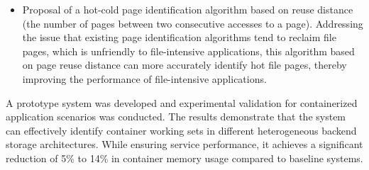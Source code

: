 \begin{englishabstract}
\begin{itemize}
    \item Proposal of a hot-cold page identification algorithm based on reuse distance (the number of pages between two consecutive accesses to a page). Addressing the issue that existing page identification algorithms tend to reclaim file pages, which is unfriendly to file-intensive applications, this algorithm based on page reuse distance can more accurately identify hot file pages, thereby improving the performance of file-intensive applications.
\end{itemize}

A prototype system was developed and experimental validation for containerized application scenarios was conducted. The results demonstrate that the system can effectively identify container working sets in different heterogeneous backend storage architectures. While ensuring service performance, it achieves a significant reduction of 5\% to 14\% in container memory usage compared to baseline systems.



\end{englishabstract}


